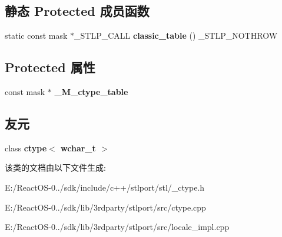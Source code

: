 \subsection*{静态 Protected 成员函数}
\begin{DoxyCompactItemize}
\item 
\mbox{\label{classctype_3_01char_01_4_af73d19313321e4ab8ff5243ecd09e108}} 
static const mask $\ast$\+\_\+\+S\+T\+L\+P\+\_\+\+C\+A\+LL {\bfseries classic\+\_\+table} () \+\_\+\+S\+T\+L\+P\+\_\+\+N\+O\+T\+H\+R\+OW
\end{DoxyCompactItemize}
\subsection*{Protected 属性}
\begin{DoxyCompactItemize}
\item 
\mbox{\label{classctype_3_01char_01_4_a40c9db8da0d5c2e4f0726474ee99d6fa}} 
const mask $\ast$ {\bfseries \+\_\+\+M\+\_\+ctype\+\_\+table}
\end{DoxyCompactItemize}
\subsection*{友元}
\begin{DoxyCompactItemize}
\item 
\mbox{\label{classctype_3_01char_01_4_aa8ee6573f33bbfcaf2bf929dc064273b}} 
class {\bfseries ctype$<$ wchar\+\_\+t $>$}
\end{DoxyCompactItemize}


该类的文档由以下文件生成\+:\begin{DoxyCompactItemize}
\item 
E\+:/\+React\+O\+S-\/0../sdk/include/c++/stlport/stl/\+\_\+ctype.\+h\item 
E\+:/\+React\+O\+S-\/0../sdk/lib/3rdparty/stlport/src/ctype.\+cpp\item 
E\+:/\+React\+O\+S-\/0../sdk/lib/3rdparty/stlport/src/locale\+\_\+impl.\+cpp\end{DoxyCompactItemize}
